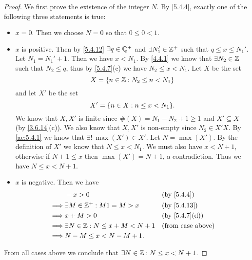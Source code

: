 \begin{proof}
	We first prove the existence of the integer \(N\).
	By \cref{5.4.4}, exactly one of the following three statements is true:
	\begin{itemize}
		\item \(x = 0\).
		      Then we choose \(N = 0\) so that \(0 \leq 0 < 1\).
		\item \(x\) is positive.
		      Then by \cref{5.4.12} \(\exists q \in \mathbb{Q}^+\) and \(\exists N_1' \in \mathbb{Z}^+\) such that \(q \leq x \leq N_1'\).
		      Let \(N_1 = N_1' + 1\).
		      Then we have \(x < N_1\).
		      By \cref{4.4.1} we know that \(\exists N_2 \in \mathbb{Z}\) such that \(N_2 \leq q\), thus by \cref{5.4.7}(c) we have \(N_2 \leq x < N_1\).
		      Let \(X\) be the set
		      \[
			      X = \left\lbrace n \in \mathbb{Z} : N_2 \leq n < N_1\right\rbrace
		      \]
		      and let \(X'\) be the set
		      \[
			      X' = \set{n \in X : n \leq x < N_1}.
		      \]
		      We know that \(X, X'\) is finite since \(\#(X) = N_1 - N_2 + 1 \geq 1\) and \(X' \subseteq X\) (by \cref{3.6.14}(c)).
		      We also know that \(X, X'\) is non-empty since \(N_2 \in X'X\).
		      By \cref{ac:5.4.1} we know that \(\exists!\ \max(X') \in X'\).
		      Let \(N = \max(X')\).
		      By the definition of \(X'\) we know that \(N \leq x < N_1\).
		      We must also have \(x < N + 1\), otherwise if \(N + 1 \leq x\) then \(\max(X') = N + 1\), a contradiction.
		      Thus we have \(N \leq x < N + 1\).
		\item \(x\) is negative.
		      Then we have
		      \begin{align*}
			               & -x > 0                                  &  & \by{5.4.4}                  \\
			      \implies & \exists M \in \Z^+ : M1 = M > x         &  & \by{5.4.13}                 \\
			      \implies & x + M > 0                               &  & \text{(by \cref{5.4.7}(d))} \\
			      \implies & \exists N \in \Z : N \leq x + M < N + 1 &  & \text{(from case above)}    \\
			      \implies & N - M \leq x < N - M + 1.
		      \end{align*}
	\end{itemize}
	From all cases above we conclude that \(\exists N \in \mathbb{Z} : N \leq x < N + 1\).


\end{proof}
